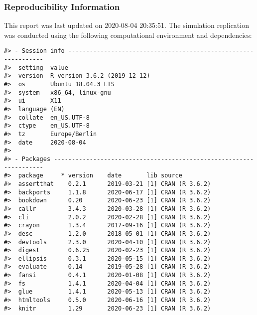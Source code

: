 \documentclass[english,doc,floatsintext]{apa6}
\begin{document}
\begingroup
\setlength{\parindent}{-0.5in}
\setlength{\leftskip}{0.5in}

\hypertarget{refs}{}

\newpage

\hypertarget{reproducibility-information}{%
\subsubsection{Reproducibility Information}\label{reproducibility-information}}

This report was last updated on 2020-08-04 20:35:51.
The simulation replication was conducted using the following computational environment and dependencies:

\begin{verbatim}
#> - Session info ---------------------------------------------------------------
#>  setting  value                       
#>  version  R version 3.6.2 (2019-12-12)
#>  os       Ubuntu 18.04.3 LTS          
#>  system   x86_64, linux-gnu           
#>  ui       X11                         
#>  language (EN)                        
#>  collate  en_US.UTF-8                 
#>  ctype    en_US.UTF-8                 
#>  tz       Europe/Berlin               
#>  date     2020-08-04                  
#> 
#> - Packages -------------------------------------------------------------------
#>  package     * version    date       lib source                      
#>  assertthat    0.2.1      2019-03-21 [1] CRAN (R 3.6.2)              
#>  backports     1.1.8      2020-06-17 [1] CRAN (R 3.6.2)              
#>  bookdown      0.20       2020-06-23 [1] CRAN (R 3.6.2)              
#>  callr         3.4.3      2020-03-28 [1] CRAN (R 3.6.2)              
#>  cli           2.0.2      2020-02-28 [1] CRAN (R 3.6.2)              
#>  crayon        1.3.4      2017-09-16 [1] CRAN (R 3.6.2)              
#>  desc          1.2.0      2018-05-01 [1] CRAN (R 3.6.2)              
#>  devtools      2.3.0      2020-04-10 [1] CRAN (R 3.6.2)              
#>  digest        0.6.25     2020-02-23 [1] CRAN (R 3.6.2)              
#>  ellipsis      0.3.1      2020-05-15 [1] CRAN (R 3.6.2)              
#>  evaluate      0.14       2019-05-28 [1] CRAN (R 3.6.2)              
#>  fansi         0.4.1      2020-01-08 [1] CRAN (R 3.6.2)              
#>  fs            1.4.1      2020-04-04 [1] CRAN (R 3.6.2)              
#>  glue          1.4.1      2020-05-13 [1] CRAN (R 3.6.2)              
#>  htmltools     0.5.0      2020-06-16 [1] CRAN (R 3.6.2)              
#>  knitr         1.29       2020-06-23 [1] CRAN (R 3.6.2)              

\end{verbatim}
\end{document}
